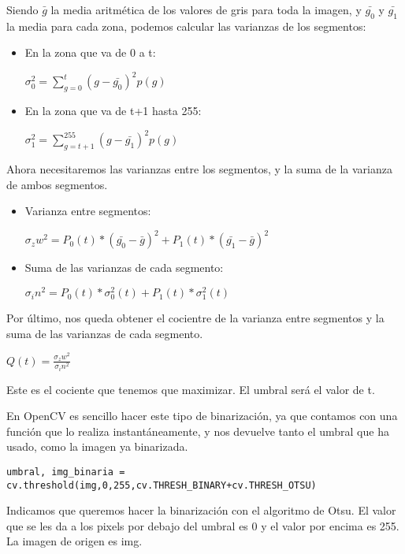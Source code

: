 Siendo $\bar{g}$ la media aritmética de los valores de gris para toda la imagen, y $\bar{g_0}$ y $\bar{g_1}$ la media para cada zona, podemos calcular las varianzas de los segmentos:

\begin{itemize}

\item En la zona que va de 0 a t:

$\sigma{_0^2} = \sum_{g=0}^{t}(g-\bar{g_0})^2p(g)$

\item En la zona que va de t+1 hasta 255:

$\sigma{_1^2} = \sum_{g=t+1}^{255}(g-\bar{g_1})^2p(g)$

\end{itemize}

Ahora necesitaremos las varianzas entre los segmentos, y la suma de la varianza de ambos segmentos.

\begin{itemize}

\item Varianza entre segmentos:

$\sigma{_zw^2} = P_0(t)*(\bar{g_0}-\bar{g})^2 + P_1(t)*(\bar{g_1}-\bar{g})^2$

\item Suma de las varianzas de cada segmento:

$\sigma{_in^2} = P_0(t)*\sigma{_0^2}(t)+P_1(t)*\sigma{_1^2}(t)$

\end{itemize}

Por último, nos queda obtener el cocientre de la varianza entre segmentos y la suma de las varianzas de cada segmento.

$Q(t) = \displaystyle\frac{\sigma{_zw^2}}{\sigma{_in^2}}$

Este es el cociente que tenemos que maximizar. El umbral será el valor de t.

En OpenCV es sencillo hacer este tipo de binarización, ya que contamos con una función que lo realiza instantáneamente, y nos devuelve tanto el umbral que ha usado, como la imagen ya binarizada.

\begin{verbatim}
umbral, img_binaria = cv.threshold(img,0,255,cv.THRESH_BINARY+cv.THRESH_OTSU)
\end{verbatim}

Indicamos que queremos hacer la binarización con el algoritmo de Otsu. El valor que se les da a los pixels por debajo del umbral es 0 y el valor por encima es 255. La imagen de origen es img.


